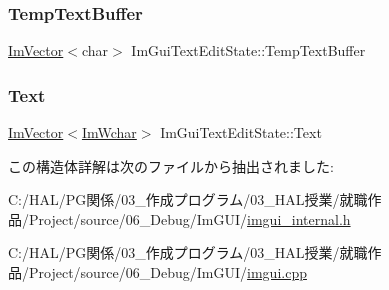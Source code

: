 \subsubsection{\texorpdfstring{Temp\+Text\+Buffer}{TempTextBuffer}}
{\footnotesize\ttfamily \mbox{\hyperlink{class_im_vector}{Im\+Vector}}$<$char$>$ Im\+Gui\+Text\+Edit\+State\+::\+Temp\+Text\+Buffer}

\mbox{\label{struct_im_gui_text_edit_state_a5c387aca48db34089a3c0ff251ff06fc}} 
\subsubsection{\texorpdfstring{Text}{Text}}
{\footnotesize\ttfamily \mbox{\hyperlink{class_im_vector}{Im\+Vector}}$<$\mbox{\hyperlink{imgui_8h_af2c7badaf05a0008e15ef76d40875e97}{Im\+Wchar}}$>$ Im\+Gui\+Text\+Edit\+State\+::\+Text}



この構造体詳解は次のファイルから抽出されました\+:\begin{DoxyCompactItemize}
\item 
C\+:/\+H\+A\+L/\+P\+G関係/03\+\_\+作成プログラム/03\+\_\+\+H\+A\+L授業/就職作品/\+Project/source/06\+\_\+\+Debug/\+Im\+G\+U\+I/\mbox{\hyperlink{imgui__internal_8h}{imgui\+\_\+internal.\+h}}\item 
C\+:/\+H\+A\+L/\+P\+G関係/03\+\_\+作成プログラム/03\+\_\+\+H\+A\+L授業/就職作品/\+Project/source/06\+\_\+\+Debug/\+Im\+G\+U\+I/\mbox{\hyperlink{imgui_8cpp}{imgui.\+cpp}}\end{DoxyCompactItemize}
